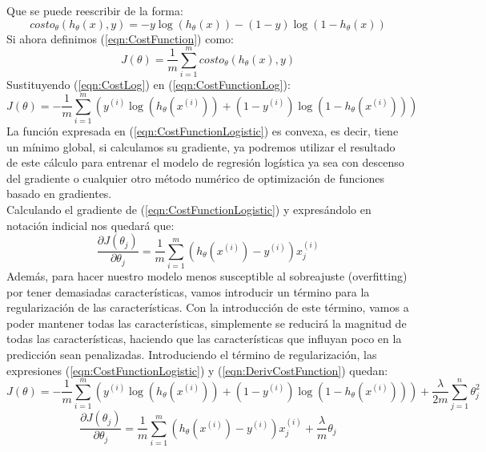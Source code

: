 \documentclass[runningheads]{llncs}
\begin{document}
Que se puede reescribir de la forma:
\begin{equation}
    costo_{\theta}(h_{\theta}(x), y) = -y\log(h_{\theta}(x)) - (1 - y)\log(1 - h_{\theta}(x))
    \label{eqn:CostLog}
\end{equation}
Si ahora definimos (\ref{eqn:CostFunction}) como:
\begin{equation}
    J(\theta) = \frac{1}{m}\sum_{i = 1}^{m}costo_{\theta}(h_{\theta}(x), y)
    \label{eqn:CostFunctionLog}
\end{equation}
Sustituyendo (\ref{eqn:CostLog}) en (\ref{eqn:CostFunctionLog}):
\begin{equation}
    J(\theta) = -\frac{1}{m}\sum_{i = 1}^{m}(y^{(i)}\log(h_{\theta}(x^{(i)})) + (1 - y^{(i)})\log(1 - h_{\theta}(x^{(i)})))
    \label{eqn:CostFunctionLogistic}
\end{equation}
La función expresada en (\ref{eqn:CostFunctionLogistic}) es convexa, es decir, tiene un mínimo global, si calculamos su gradiente, ya podremos utilizar el resultado de este cálculo para entrenar el modelo de regresión logística ya sea con descenso del gradiente o cualquier otro método numérico de optimización de funciones basado en gradientes.\\
Calculando el gradiente de (\ref{eqn:CostFunctionLogistic}) y expresándolo en notación indicial nos quedará que:
\begin{equation}
    \frac{\partial J(\theta_j)}{\partial\theta_j } = \frac{1}{m}\sum_{i = 1}^{m}(h_{\theta}(x^{(i)}) - y^{(i)})x_j^{(i)}
    \label{eqn:DerivCostFunction}
\end{equation}
Además, para hacer nuestro modelo menos susceptible al sobreajuste (overfitting) por tener demasiadas características, vamos introducir un término para la regularización de las características. Con la introducción de este término, vamos a poder mantener todas las características, simplemente se reducirá la magnitud de todas las características, haciendo que las características que influyan poco en la predicción sean penalizadas. Introduciendo el término de regularización, las expresiones (\ref{eqn:CostFunctionLogistic}) y  (\ref{eqn:DerivCostFunction}) quedan:
\begin{equation}
        J(\theta) = -\frac{1}{m}\sum_{i = 1}^{m}(y^{(i)}\log(h_{\theta}(x^{(i)})) + (1 - y^{(i)})\log(1 - h_{\theta}(x^{(i)}))) + \frac{\lambda}{2m}\sum_{j = 1}^{n}\theta_j^2
    \label{eqn:CostFunctionLogisticReg}
\end{equation}
\begin{equation}
        \frac{\partial J(\theta_j)}{\partial\theta_j } = \frac{1}{m}\sum_{i = 1}^{m}(h_{\theta}(x^{(i)}) - y^{(i)})x_j^{(i)} + \frac{\lambda}{m}\theta_j
    \label{eqn:DerivCostFunctionReg}
\end{equation}
\end{document}
